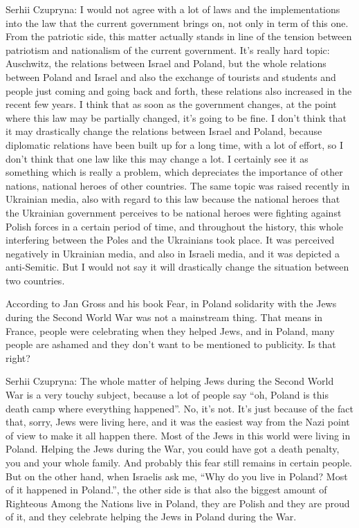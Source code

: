 Serhii Czupryna: I would not agree with a lot of laws and the implementations into the law that the current government brings on, not only in term of this one. From the patriotic side, this matter actually stands in line of the tension between patriotism and nationalism of the current government. It’s really hard topic: Auschwitz, the relations between Israel and Poland, but the whole relations between Poland and Israel and also the exchange of tourists and students and people just coming and going back and forth, these relations also increased in the recent few years. I think that as soon as the government changes, at the point where this law may be partially changed, it’s going to be fine. I don’t think that it may drastically change the relations between Israel and Poland, because diplomatic relations have been built up for a long time, with a lot of effort, so I don’t think that one law like this may change a lot. I certainly see it as something which is really a problem, which depreciates the importance of other nations, national heroes of other countries. The same topic was raised recently in Ukrainian media, also with regard to this law because the national heroes that the Ukrainian government perceives to be national heroes were fighting against Polish forces in a certain period of time, and throughout the history, this whole interfering between the Poles and the Ukrainians took place. It was perceived negatively in Ukrainian media, and also in Israeli media, and it was depicted a anti-Semitic. But I would not say it will drastically change the situation between two countries.  

According to Jan Gross and his book Fear, in Poland solidarity with the Jews during the Second World War was not a mainstream thing. That means in France, people were celebrating when they helped Jews, and in Poland, many people are ashamed and they don’t want to be mentioned to publicity. Is that right? 

Serhii Czupryna: The whole matter of helping Jews during the Second World War is a very touchy subject, because a lot of people say “oh, Poland is this death camp where everything happened”. No, it’s not. It’s just because of the fact that, sorry, Jews were living here, and it was the easiest way from the Nazi point of view to make it all happen there. Most of the Jews in this world were living in Poland. Helping the Jews during the War, you could have got a death penalty, you and your whole family. And probably this fear still remains in certain people. But on the other hand, when Israelis ask me, “Why do you live in Poland? Most of it happened in Poland.”, the other side is that also the biggest amount of Righteous Among the Nations live in Poland, they are Polish and they are proud of it, and they celebrate helping the Jews in Poland during the War. 

